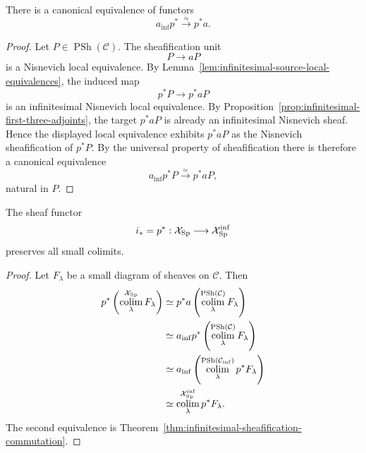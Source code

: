 \begin{theorem}
\label{thm:infinitesimal-sheafification-commutation}
There is a canonical equivalence of functors
\[
    \boxed{
    a_{\mathrm{inf}}p^*\xrightarrow{\simeq}p^*a.
    }
\]
\end{theorem}

\begin{proof}
Let $P\in\operatorname{PSh}(\mathcal C)$.  The sheafification unit
\[
    P\longrightarrow aP
\]
is a Nisnevich local equivalence.  By
Lemma~\ref{lem:infinitesimal-source-local-equivalences}, the induced map
\[
    p^*P\longrightarrow p^*aP
\]
is an infinitesimal Nisnevich local equivalence.  By
Proposition~\ref{prop:infinitesimal-first-three-adjoints}, the target
$p^*aP$ is already an infinitesimal Nisnevich sheaf.  Hence the displayed
local equivalence exhibits $p^*aP$ as the Nisnevich sheafification of
$p^*P$.  By the universal property of sheafification there is therefore a
canonical equivalence
\[
    a_{\mathrm{inf}}p^*P
    \xrightarrow{\simeq}
    p^*aP,
\]
natural in $P$.
\end{proof}

\begin{corollary}
\label{cor:infinitesimal-i-star-colimits}
The sheaf functor
\[
    i_*=p^*:\mathcal X_{\mathrm{Sp}}\longrightarrow
    \mathcal X_{\mathrm{Sp}}^{\mathrm{inf}}
\]
preserves all small colimits.
\end{corollary}

\begin{proof}
Let $F_\lambda$ be a small diagram of sheaves on $\mathcal C$.  Then
\[
\begin{aligned}
    p^*\left(\operatorname*{colim}_{\lambda}^{\mathcal X_{\mathrm{Sp}}}F_\lambda\right)
    &\simeq
    p^*a\left(\operatorname*{colim}_{\lambda}^{\operatorname{PSh}(\mathcal C)}F_\lambda\right)\\
    &\simeq
    a_{\mathrm{inf}}p^*
    \left(\operatorname*{colim}_{\lambda}^{\operatorname{PSh}(\mathcal C)}F_\lambda\right)\\
    &\simeq
    a_{\mathrm{inf}}
    \left(\operatorname*{colim}_{\lambda}^{\operatorname{PSh}(\mathcal C_{\mathrm{inf}})}p^*F_\lambda\right)\\
    &\simeq
    \operatorname*{colim}_{\lambda}^{\mathcal X_{\mathrm{Sp}}^{\mathrm{inf}}}p^*F_\lambda.
\end{aligned}
\]
The second equivalence is
Theorem~\ref{thm:infinitesimal-sheafification-commutation}.
\end{proof}

